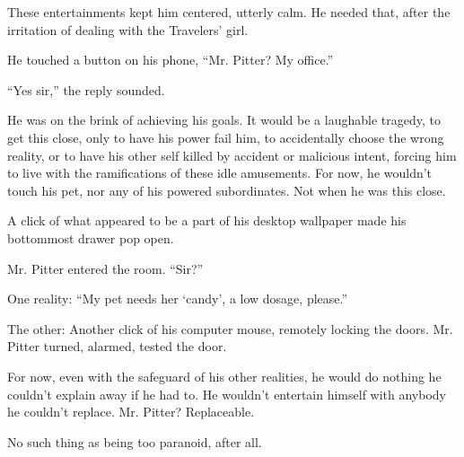 These entertainments kept him centered, utterly calm.  He needed that, after the irritation of dealing with the Travelers' girl.



He touched a button on his phone, ``Mr. Pitter?  My office.''



``Yes sir,'' the reply sounded.



He was on the brink of achieving his goals.  It would be a laughable tragedy, to get this close, only to have his power fail him, to accidentally choose the wrong reality, or to have his other self killed by accident or malicious intent, forcing him to live with the ramifications of these idle amusements.  For now, he wouldn't touch his pet, nor any of his powered subordinates.  Not when he was this close.



A click of what appeared to be a part of his desktop wallpaper made his bottommost drawer pop open.



Mr. Pitter entered the room.  ``Sir?''



One reality: ``My pet needs her `candy', a low dosage, please.''



The other: Another click of his computer mouse, remotely locking the doors.  Mr. Pitter turned, alarmed, tested the door.



For now, even with the safeguard of his other realities, he would do nothing he couldn't explain away if he had to.  He wouldn't entertain himself with anybody he couldn't replace.  Mr. Pitter?  Replaceable.



No such thing as being too paranoid, after all.





